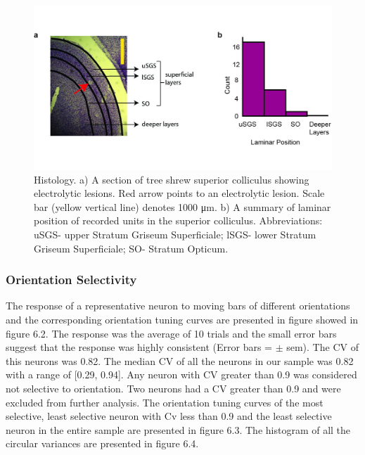	\begin{figure}
		
		\includegraphics[width=\linewidth]{superiorcolliculus/anatpos.jpg}
		\caption{Histology. a) A section of tree shrew superior colliculus showing electrolytic lesions. Red arrow
			points to an electrolytic lesion. Scale bar (yellow vertical line) denotes 1000 μm. b) A summary of laminar
			position of recorded units in the superior colliculus. Abbreviations: uSGS- upper Stratum Griseum Superficiale;
			lSGS- lower Stratum Griseum Superficiale; SO- Stratum Opticum.}
		\label{fig:fig1}
	\end{figure}
	
	
	
	\subsubsection{Orientation Selectivity}
	
		The response of a representative neuron to moving bars of different orientations and the corresponding orientation tuning curves are presented in figure showed in figure 6.2. The response was the average of 10 trials and the small error bars suggest that the response was highly consistent (Error bars = $\pm$ sem). The CV of this neurons was 0.82. The median CV of all the neurons in our sample was 0.82 with a range of [0.29, 0.94]. Any neuron with CV greater than 0.9 was considered not selective to orientation. Two neurons had a CV greater than 0.9 and were excluded from further analysis. The orientation tuning curves of the most selective, least selective neuron with Cv less than 0.9 and the least selective neuron in the entire sample are presented in figure 6.3. The histogram of all the circular variances are presented in figure 6.4.
	

